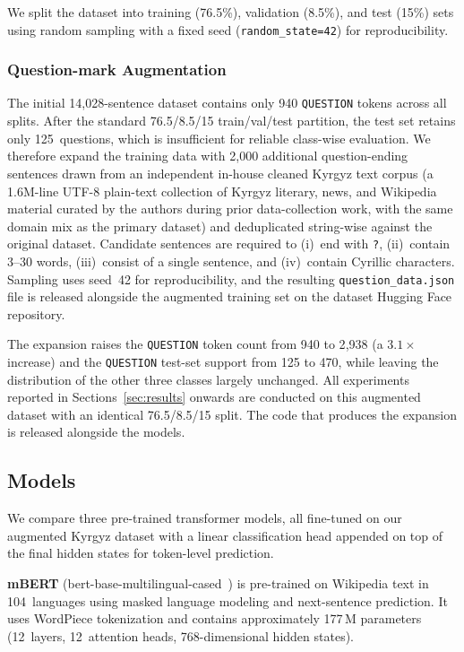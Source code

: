 \documentclass[manuscript, review]{acmart}
\begin{document}
We split the dataset into training (76.5\%), validation (8.5\%), and test (15\%) sets using random sampling with a fixed seed (\texttt{random\_state=42}) for reproducibility.

\subsubsection{Question-mark Augmentation}
\label{sec:augmentation}

The initial 14{,}028-sentence dataset contains only 940 \texttt{QUESTION} tokens across all splits. After the standard 76.5/8.5/15 train/val/test partition, the test set retains only 125~questions, which is insufficient for reliable class-wise evaluation. We therefore expand the training data with 2{,}000 additional question-ending sentences drawn from an independent in-house cleaned Kyrgyz text corpus (a 1.6M-line UTF-8 plain-text collection of Kyrgyz literary, news, and Wikipedia material curated by the authors during prior data-collection work, with the same domain mix as the primary dataset) and deduplicated string-wise against the original dataset. Candidate sentences are required to (i)~end with \texttt{?}, (ii)~contain 3--30 words, (iii)~consist of a single sentence, and (iv)~contain Cyrillic characters. Sampling uses seed~42 for reproducibility, and the resulting \texttt{question\_data.json} file is released alongside the augmented training set on the dataset Hugging Face repository.

The expansion raises the \texttt{QUESTION} token count from 940 to 2{,}938 (a $3.1\times$ increase) and the \texttt{QUESTION} test-set support from 125 to 470, while leaving the distribution of the other three classes largely unchanged. All experiments reported in Sections~\ref{sec:results} onwards are conducted on this augmented dataset with an identical 76.5/8.5/15 split. The code that produces the expansion is released alongside the models.

\subsection{Models}

We compare three pre-trained transformer models, all fine-tuned on our augmented Kyrgyz dataset with a linear classification head appended on top of the final hidden states for token-level prediction.

\textbf{mBERT} (bert-base-multilingual-cased~\cite{devlin2019bert}) is pre-trained on Wikipedia text in 104~languages using masked language modeling and next-sentence prediction. It uses WordPiece tokenization and contains approximately 177\,M parameters (12~layers, 12~attention heads, 768-dimensional hidden states).
\end{document}
